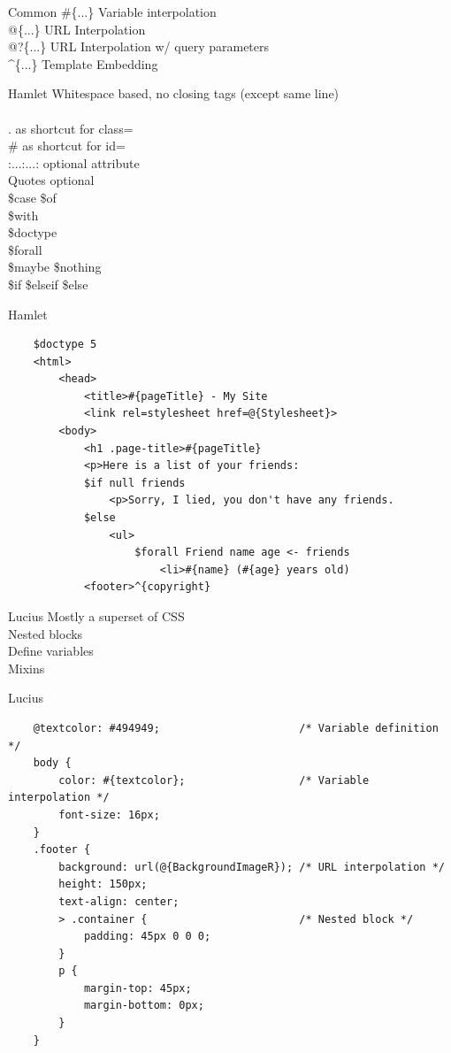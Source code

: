 \documentclass[pdf]{beamer}
\begin{document}
\begin{frame}{Common}
  \#\{...\} Variable interpolation\\
  @\{...\} URL Interpolation\\
  @?\{...\} URL Interpolation w/ query parameters\\
  \textasciicircum\{...\} Template Embedding\\
\end{frame}

\begin{frame}{Hamlet}
  Whitespace based, no closing tags (except same line)\\
  \\
  . as shortcut for class=\\
  \# as shortcut for id=\\
  :...:...: optional attribute\\
  Quotes optional\\
  \$case \$of \\
  \$with \\
  \$doctype \\
  \$forall \\
  \$maybe \$nothing\\
  \$if \$elseif \$else\\
\end{frame}

\begin{frame}[fragile]{Hamlet}
  \begin{verbatim}
    $doctype 5
    <html>
        <head>
            <title>#{pageTitle} - My Site
            <link rel=stylesheet href=@{Stylesheet}>
        <body>
            <h1 .page-title>#{pageTitle}
            <p>Here is a list of your friends:
            $if null friends
                <p>Sorry, I lied, you don't have any friends.
            $else
                <ul>
                    $forall Friend name age <- friends
                        <li>#{name} (#{age} years old)
            <footer>^{copyright}
  \end{verbatim}
\end{frame}

\begin{frame}{Lucius}
  Mostly a superset of CSS\\
  Nested blocks\\
  Define variables\\
  Mixins\\
\end{frame}

\begin{frame}[fragile]{Lucius}
  \begin{verbatim}
    @textcolor: #494949;                      /* Variable definition */
    body {
        color: #{textcolor};                  /* Variable interpolation */
        font-size: 16px;
    }
    .footer {
        background: url(@{BackgroundImageR}); /* URL interpolation */
        height: 150px;
        text-align: center;
        > .container {                        /* Nested block */
            padding: 45px 0 0 0;
        }
        p {
            margin-top: 45px;
            margin-bottom: 0px;
        }
    }
  \end{verbatim}
\end{frame}
\end{document}
